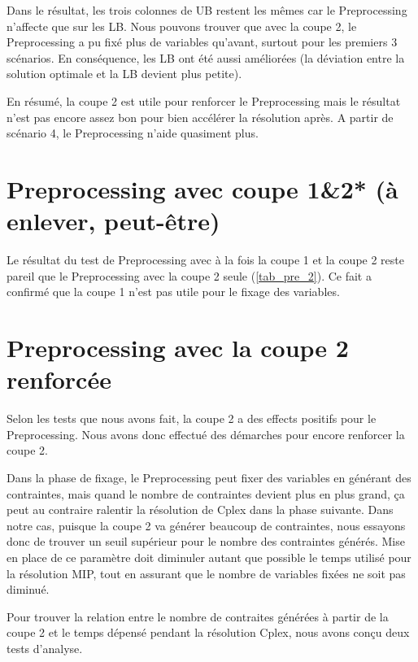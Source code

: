 \documentclass[twoside,fleqn]{EPURapport}
\begin{document}
Dans le résultat, les trois colonnes de UB restent les mêmes car le Preprocessing n'affecte que sur les LB. Nous pouvons trouver que avec la coupe 2, le Preprocessing a pu fixé plus de variables qu'avant, surtout pour les premiers 3 scénarios. En conséquence, les LB ont été aussi améliorées (la déviation entre la solution optimale et la LB devient plus petite).

En résumé, la coupe 2 est utile pour renforcer le Preprocessing mais le résultat n'est pas encore assez bon pour bien accélérer la résolution après. A partir de scénario 4, le Preprocessing n'aide quasiment plus.

\section{Preprocessing avec coupe 1\&2* (à enlever, peut-être)}
Le résultat du test de Preprocessing avec à la fois la coupe 1 et la coupe 2 reste pareil que le Preprocessing avec la coupe 2 seule (\ref{tab_pre_2}). Ce fait a confirmé que la coupe 1 n'est pas utile pour le fixage des variables.


\section{Preprocessing avec la coupe 2 renforcée}
Selon les tests que nous avons fait, la coupe 2 a des effects positifs pour le Preprocessing. Nous avons donc effectué des démarches pour encore renforcer la coupe 2.

Dans la phase de fixage, le Preprocessing peut fixer des variables en générant des contraintes, mais quand le nombre de contraintes devient plus en plus grand, ça peut au contraire ralentir la résolution de Cplex dans la phase suivante. Dans notre cas, puisque la coupe 2 va générer beaucoup de contraintes, nous essayons donc de trouver un seuil supérieur pour le nombre des contraintes générés. Mise en place de ce paramètre doit diminuler autant que possible le temps utilisé pour la résolution MIP, tout en assurant que le nombre de variables fixées ne soit pas diminué.

Pour trouver la relation entre le nombre de contraites générées à partir de la coupe 2 et le temps dépensé pendant la résolution Cplex, nous avons conçu deux tests d'analyse.
\end{document}

